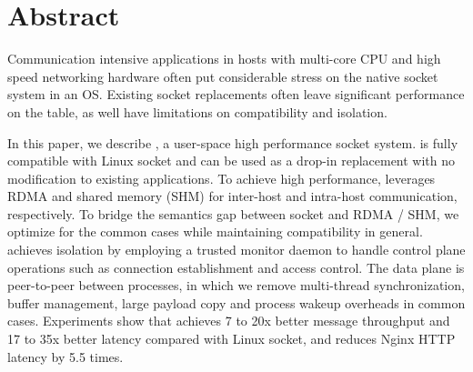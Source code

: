 \section*{Abstract}

Communication intensive applications in hosts with multi-core CPU and high speed networking hardware often put considerable stress on the native socket system in an OS. 
Existing socket replacements often leave significant performance on the table, as well have limitations on compatibility and isolation.



In this paper, we describe \sys, a user-space high performance socket system.
\sys is fully compatible with Linux socket and can be used as a drop-in replacement with no modification to existing applications.
To achieve high performance, \sys{} leverages RDMA and shared memory (SHM) for inter-host and intra-host communication, respectively.
To bridge the semantics gap between socket and RDMA / SHM, we optimize for the common cases while maintaining compatibility in general.
\sys achieves isolation by employing a trusted monitor daemon to handle control plane operations such as connection establishment and access control.
The data plane is peer-to-peer between processes, in which we remove multi-thread synchronization, buffer management, large payload copy and process wakeup overheads in common cases.
Experiments show that \sys achieves 7 to 20x better message throughput and 17 to 35x better latency compared with Linux socket, and reduces Nginx HTTP latency by 5.5 times.
